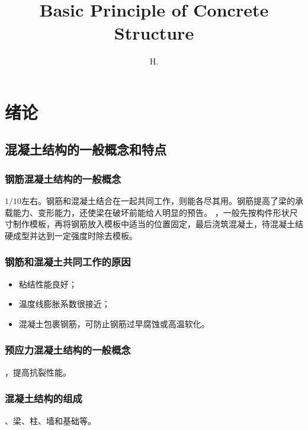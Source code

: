 \documentclass{article}
\begin{document}
\title{Basic Principle of Concrete Structure}
\author{H.}
\maketitle
\tableofcontents
\section{绪论}
\subsection{混凝土结构的一般概念和特点}
\subsubsection{钢筋混凝土结构的一般概念}
$1/10$左右。钢筋和混凝土结合在一起共同工作，则能各尽其用。钢筋提高了梁的承载能力、变形能力，还使梁在破坏前能给人明显的预告。
，一般先按构件形状尺寸制作模板，再将钢筋放入模板中适当的位置固定，最后浇筑混凝土，待混凝土结硬成型并达到一定强度时除去模板。
\subsubsection{钢筋和混凝土共同工作的原因}
\begin{itemize}
    \item 粘结性能良好；
    \item 温度线膨胀系数很接近；
    \item 混凝土包裹钢筋，可防止钢筋过早腐蚀或高温软化。
\end{itemize}
\subsubsection{预应力混凝土结构的一般概念}
，提高抗裂性能。
\subsubsection{混凝土结构的组成}
、梁、柱、墙和基础等。
\end{document}
